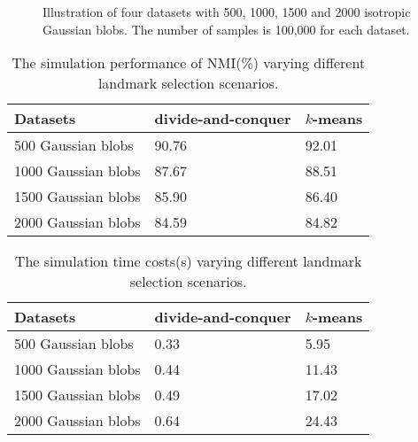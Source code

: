 \begin{figure}\begin{center}
    {}
    {}
    {}
    {}
    \caption{Illustration of four datasets with 500, 1000, 1500 and 2000 isotropic Gaussian blobs. The number of samples is 100,000 for each dataset.}
    \label{fig:simulation_landmarks}
  \end{center}
\end{figure}

\begin{table}[]
    \centering
    \caption{The simulation performance of NMI(\%) varying different landmark selection scenarios.}
    \label{tab:simulation_landmark_NMI}
    \begin{tabular}{@{}lll@{}}
    \toprule
    Datasets & divide-and-conquer                 & $k$-means            \\ \midrule
    500 Gaussian blobs             & 90.76 & 92.01 \\
    1000 Gaussian blobs            & 87.67 & 88.51 \\
    1500 Gaussian blobs            & 85.90 & 86.40 \\
    2000 Gaussian blobs            & 84.59  & 84.82  \\ \bottomrule
    \end{tabular}
    \end{table}
    
    
    \begin{table}[]
    \centering
    \caption{The simulation time costs(s) varying different landmark selection scenarios.}
    \label{tab:simulation_landmark_time}
    \begin{tabular}{@{}lll@{}}
    \toprule
    Datasets & divide-and-conquer               & $k$-means            \\ \midrule
    500 Gaussian blobs             & 0.33 & 5.95  \\
    1000 Gaussian blobs            & 0.44 & 11.43 \\
    1500 Gaussian blobs            & 0.49 & 17.02 \\
    2000 Gaussian blobs            & 0.64 & 24.43 \\ \bottomrule
    \end{tabular}
    \end{table}







